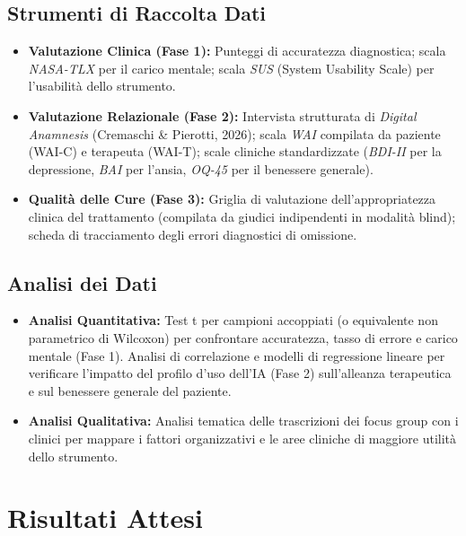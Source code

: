 \documentclass[11pt,a4paper]{article}
\begin{document}
\subsection{Strumenti di Raccolta Dati}
\begin{itemize}
    \item \textbf{Valutazione Clinica (Fase 1):} Punteggi di accuratezza diagnostica; scala \textit{NASA-TLX} per il carico mentale; scala \textit{SUS} (System Usability Scale) per l'usabilità dello strumento.
    \item \textbf{Valutazione Relazionale (Fase 2):} Intervista strutturata di \textit{Digital Anamnesis} (Cremaschi \& Pierotti, 2026); scala \textit{WAI} compilata da paziente (WAI-C) e terapeuta (WAI-T); scale cliniche standardizzate (\textit{BDI-II} per la depressione, \textit{BAI} per l'ansia, \textit{OQ-45} per il benessere generale).
    \item \textbf{Qualità delle Cure (Fase 3):} Griglia di valutazione dell'appropriatezza clinica del trattamento (compilata da giudici indipendenti in modalità blind); scheda di tracciamento degli errori diagnostici di omissione.
\end{itemize}

\subsection{Analisi dei Dati}
\begin{itemize}
    \item \textbf{Analisi Quantitativa:} Test t per campioni accoppiati (o equivalente non parametrico di Wilcoxon) per confrontare accuratezza, tasso di errore e carico mentale (Fase 1). Analisi di correlazione e modelli di regressione lineare per verificare l'impatto del profilo d'uso dell'IA (Fase 2) sull'alleanza terapeutica e sul benessere generale del paziente.
    \item \textbf{Analisi Qualitativa:} Analisi tematica delle trascrizioni dei focus group con i clinici per mappare i fattori organizzativi e le aree cliniche di maggiore utilità dello strumento.
\end{itemize}

\section{Risultati Attesi}
\end{document}
